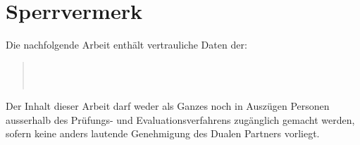 \chapter*{Sperrvermerk}
Die nachfolgende Arbeit enthält vertrauliche Daten der:
\begin{quote}
	\firmaName \\
	\firmaStrasse \\
	\firmaPlz
\end{quote}

\vspace{0.5cm}

Der Inhalt dieser Arbeit darf weder als Ganzes noch in Auszügen Personen ausserhalb des Prüfungs- und Evaluationsverfahrens zugänglich gemacht werden, sofern keine anders lautende Genehmigung des Dualen Partners vorliegt.